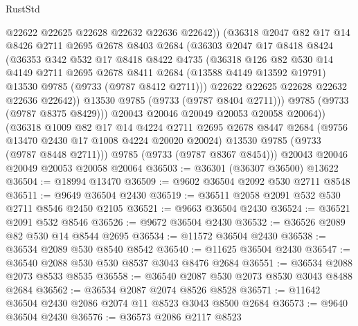 \begin{lexlean}{RustStd}
\begin{coremodule}
{\begin{coremodule}
{{{{{{{{{{{{{{{{{{{{{{{{{{{{{{{{{{{{{{{{{{{{{{{{{{{{{{{                @22622
                @22625
                @22628
                @22632
                @22636
                @22642))
            (@36318
              @2047
              @82
              @17
              @14
              @8426
              @2711
              @2695
              @2678
              @8403
              @2684
              (@36303
                @2047
                @17
                @8418
                @8424
                (@36353
                  @342
                  @532
                  @17
                  @8418
                  @8422
                  @4735
                  (@36318
                    @126
                    @82
                    @530
                    @14
                    @4149
                    @2711
                    @2695
                    @2678
                    @8411
                    @2684
                    (@13588 @4149 @13592 @19791)
                    @13530
                    @9785
                    (@9733 (@9787 @8412 @2711)))
                  @22622
                  @22625
                  @22628
                  @22632
                  @22636
                  @22642))
              @13530
              @9785
              (@9733 (@9787 @8404 @2711)))
            @9785
            (@9733 (@9787 @8375 @8429)))
          @20043
          @20046
          @20049
          @20053
          @20058
          @20064))
      (@36318
        @1009
        @82
        @17
        @14
        @4224
        @2711
        @2695
        @2678
        @8447
        @2684
        (@9756 @13470 @2430 @17 @1008 @4224 @20020 @20024)
        @13530
        @9785
        (@9733 (@9787 @8448 @2711)))
      @9785
      (@9733 (@9787 @8367 @8454)))
    @20043
    @20046
    @20049
    @20053
    @20058
    @20064
@36503 := @36301 (@36307 @36500) @13622
@36504 := @18994 @13470
@36509 := @9602 @36504 @2092 @530 @2711 @8548
@36511 := @9649 @36504 @2430
@36519 := @36511 @2058 @2091 @532 @530 @2711 @8546 @2450 @2105
@36521 := @9663 @36504 @2430
@36524 := @36521 @2091 @532 @8546
@36526 := @9672 @36504 @2430
@36532 := @36526 @2089 @82 @530 @14 @8544 @2695
@36534 := @11572 @36504 @2430
@36538 := @36534 @2089 @530 @8540 @8542
@36540 := @11625 @36504 @2430
@36547 := @36540 @2088 @530 @530 @8537 @3043 @8476 @2684
@36551 := @36534 @2088 @2073 @8533 @8535
@36558 := @36540 @2087 @530 @2073 @8530 @3043 @8488 @2684
@36562 := @36534 @2087 @2074 @8526 @8528
@36571 := @11642 @36504 @2430 @2086 @2074 @11 @8523 @3043 @8500 @2684
@36573 := @9640 @36504 @2430
@36576 := @36573 @2086 @2117 @8523
}}}}}}}}}}}}}}}}}}}}}}}}}}}}}}}}}}}}}}}}}}}}}}}}}}}}}}}
\end{coremodule}}
\end{coremodule}
\end{lexlean}
